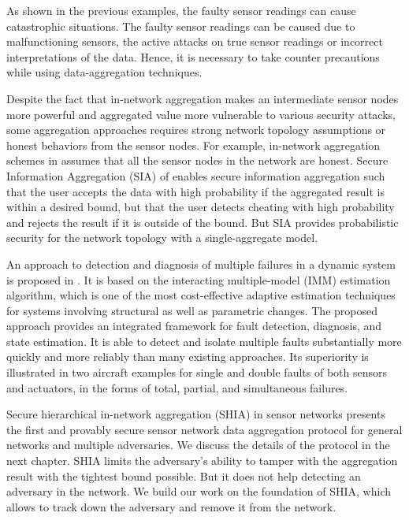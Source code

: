 	As shown in the previous examples, the faulty sensor readings can cause catastrophic situations. 
	The faulty sensor readings can be caused due to malfunctioning sensors, the active attacks on true sensor readings or incorrect interpretations of the data.
	Hence, it is necessary to take counter precautions while using data-aggregation techniques.
	
	Despite the fact that in-network aggregation makes an intermediate sensor nodes more powerful and aggregated value more vulnerable to various security attacks, some aggregation approaches requires strong network topology assumptions or honest behaviors from the sensor nodes.
	For example, in-network aggregation schemes in \cite{yao2002cougar, madden2003design} assumes that all the sensor nodes in the network are honest. 
	Secure Information Aggregation (SIA) of \cite{przydatek2003sia} enables secure information aggregation such that the user accepts the data with high probability if the aggregated result is within a desired bound, but that the user detects cheating with high probability and rejects the result if it is outside of the bound.
	But SIA provides probabilistic security for the network topology with a single-aggregate model.

	An approach to detection and diagnosis of multiple failures in a dynamic system is proposed in \cite{zhang1998detection}. 
	It is based on the interacting multiple-model (IMM) estimation algorithm, which is one of the most cost-effective adaptive estimation techniques for systems involving structural as well as parametric changes. 
	The proposed approach provides an integrated framework for fault detection, diagnosis, and state estimation. 
	It is able to detect and isolate multiple faults substantially more quickly and more reliably than many existing approaches. 
	Its superiority is illustrated in two aircraft examples for single and double faults of both sensors and actuators, in the forms of total, partial, and simultaneous failures. 

	Secure hierarchical in-network aggregation (SHIA) in sensor networks \cite{chan2006secure} presents the first and provably secure sensor network data aggregation protocol for general networks and multiple adversaries. 
	We discuss the details of the protocol in the next chapter. 
	SHIA limits the adversary's ability to tamper with the aggregation result with the tightest bound possible.
	But it does not help detecting an adversary in the network.
	We build our work on the foundation of SHIA, which allows to track down the adversary and remove it from the network.